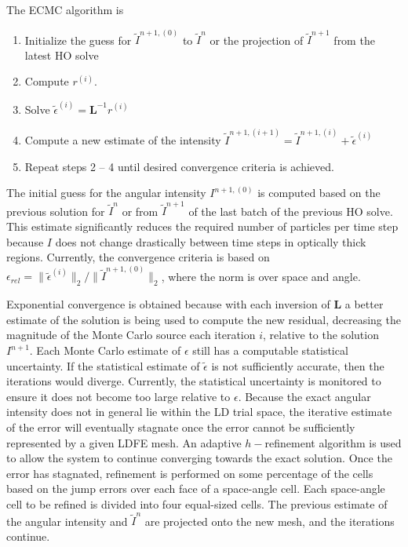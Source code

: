 \documentclass{mc2013}
\newcommand{\B}[1]{\ensuremath{\mathbf{#1}}}
\begin{document}
The ECMC algorithm is
\begin{enumerate}
    \item Initialize the guess for $\tilde{I}^{n+1,(0)}$ to $\tilde{I}^{n}$ or the
        projection of $\tilde{I}^{n+1}$ from the latest HO solve
\item Compute $r^{(i)}$.
\item Solve $\tilde{\epsilon}^{(i)} = \B L^{-1} r^{(i)}$
\item Compute a new estimate of the intensity $\tilde I^{n+1,(i+1)} = \tilde I^{n+1,(i)}
+ \tilde\epsilon^{(i)}$
\item Repeat steps 2 -- 4 until desired convergence criteria is achieved. 
\end{enumerate}
The initial guess for the angular intensity $I^{n+1,(0)}$ is computed based on the previous solution
for $\tilde{I}^{n}$ or from $\tilde{I}^{n+1}$ of the last batch of the previous
HO solve. This estimate significantly reduces the required number of
particles per time step because $I$ does not change drastically between time steps in
optically thick regions.  Currently, the convergence criteria is based on $\epsilon_{rel} =
\|\tilde{\epsilon}^{(i)}\|_2/\|\tilde{I}^{n+1,(0)}\|_2$, where the norm is over space
and angle. 

Exponential convergence is obtained because with each inversion of $\B L$ a
better estimate of the solution is being used to compute the new residual, decreasing
the magnitude of the Monte Carlo source each iteration $i$, relative to the solution
$I^{n+1}$.  Each Monte Carlo
estimate of $\epsilon$ still has a computable statistical uncertainty.  If the statistical estimate of $\tilde\epsilon$ is not sufficiently
accurate, then the iterations would diverge.  Currently, the statistical uncertainty
is monitored to ensure it does not become too large relative to $\epsilon$.
Because the exact angular intensity does not in general lie within the LD trial space, the
iterative estimate of the error will eventually stagnate once the error cannot be sufficiently
represented by a given LDFE mesh.  An adaptive $h-$refinement algorithm is used
to allow the system to continue converging towards the exact solution.  Once the
error has stagnated, refinement is performed on some percentage of the cells
based on the jump errors over each face of a space-angle cell.  Each space-angle cell
to be refined is divided into four equal-sized cells.  The previous estimate of the
angular intensity and $\tilde{I}^{n}$ are projected onto the new mesh, and the
iterations continue. 
\end{document}
